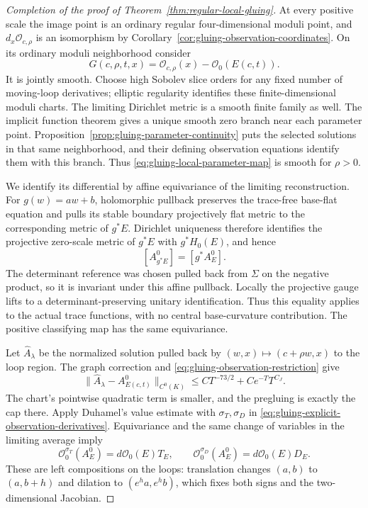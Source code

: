 \documentclass[11pt]{amsart}
\theoremstyle{definition}
\theoremstyle{remark}
\theoremstyle{plain}
\begin{document}
\begin{proof}[Completion of the proof of Theorem~\ref{thm:regular-local-gluing}]
At every positive scale the image point is an ordinary regular
four-dimensional moduli point, and $d_x\mathcal O_{c,\rho}$
is an isomorphism by
Corollary~\ref{cor:gluing-observation-coordinates}. On its ordinary
moduli neighborhood consider
\[
           G(c,\rho,t,x)=\mathcal O_{c,\rho}(x)-\mathcal O_0(E(c,t)).
\]
It is jointly smooth. Choose high Sobolev slice orders for any fixed
number of moving-loop derivatives; elliptic regularity identifies
these finite-dimensional moduli charts. The limiting Dirichlet metric
is a smooth finite family as well. The implicit function theorem
gives a unique smooth zero branch near each parameter point.
Proposition~\ref{prop:gluing-parameter-continuity} puts the selected
solutions in that same neighborhood, and their defining observation
equations identify them with this branch. Thus
\eqref{eq:gluing-local-parameter-map} is smooth for $\rho>0$.

We identify its differential by affine equivariance of the limiting
reconstruction. For $g(w)=aw+b$, holomorphic pullback preserves
the trace-free base-flat equation and pulls its stable boundary
projectively flat metric to the corresponding metric of $g^*E$.
Dirichlet uniqueness therefore identifies the projective zero-scale
metric of $g^*E$ with $g^*H_0(E)$, and hence
\[
                              [A^0_{g^*E}]=[g^*A_E^0].
\]
The determinant reference was chosen pulled back from $\Sigma$
on the negative product, so it is invariant under this affine
pullback. Locally the projective gauge lifts to a determinant-preserving
unitary identification. Thus this equality applies to the actual
trace functions, with no central base-curvature contribution.
The positive classifying map has the same equivariance.

Let $\widehat A_\lambda$ be the normalized solution pulled back
by $(w,x)\mapsto(c+\rho w,x)$ to the loop region. The graph
correction and \eqref{eq:gluing-observation-restriction} give
\begin{equation}\label{eq:gluing-rescaled-observation-error}
        \|\widehat A_\lambda-A^0_{E(c,t)}\|_{C^0(K)}
                         \leq CT^{-73/2}+Ce^{-T}T^{C_J}.
\end{equation}
The chart's pointwise quadratic term is smaller, and the pregluing
is exactly the cap there. Apply Duhamel's value estimate with
$\sigma_T,\sigma_D$ in
\eqref{eq:gluing-explicit-observation-derivatives}. Equivariance
and the same change of variables in the limiting average imply
\[
              \mathcal O_0^{\sigma_T}(A_E^0)=d\mathcal O_0(E)T_E,
              \qquad
              \mathcal O_0^{\sigma_D}(A_E^0)=d\mathcal O_0(E)D_E.
\]
These are left compositions on the loops: translation changes
$(a,b)$ to $(a,b+h)$ and dilation to $(e^ha,e^hb)$,
which fixes both signs and the two-dimensional Jacobian.


\end{proof}
\end{document}
